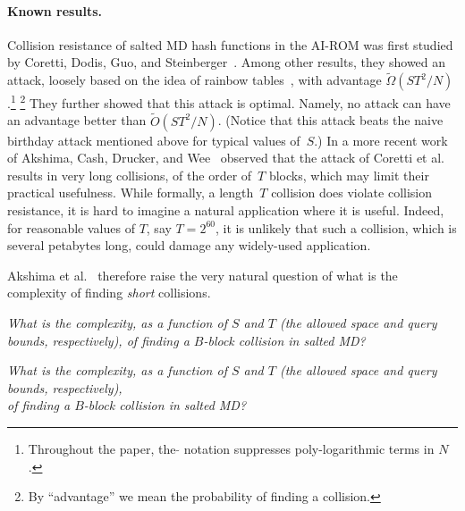 \paragraph{Known results.}
Collision resistance of salted MD hash functions in the AI-ROM was first
studied by Coretti, Dodis, Guo, and Steinberger~\cite{CorettiDGS18}. Among other results, they showed an attack,  loosely based on the idea of rainbow tables~\cite{Hellman80,Oechslin03}, with advantage $\tilde\Omega(ST^2/N)$.\footnote{Throughout the paper, the $\tilde{}$ notation suppresses poly-logarithmic terms in $N$.} \footnote{By ``advantage'' we mean the probability of finding a collision.} They further showed that this attack is optimal. Namely, no attack can have an advantage better than $\tilde O(ST^2/N)$. (Notice that this attack beats the naive birthday attack mentioned above for typical values of~$S$.) In a more recent work of Akshima,  Cash, Drucker, and Wee~\cite{AkshimaCDW20} observed that the attack of Coretti et al.~\cite{CorettiDGS18} results in very long collisions, of the order of~$T$ blocks, which may limit their practical usefulness. While formally, a length~$T$ collision does violate collision resistance, it is hard to imagine a natural application where it is useful. Indeed, for reasonable values of $T$, say $T=2^{60}$, it is unlikely that such a collision, which is several petabytes long, could damage any widely-used application.

Akshima et al.~\cite{AkshimaCDW20} therefore raise the very natural question of what is the complexity of finding \emph{short} collisions. 

\ifnum{}
\begin{center}
{ \it What is the complexity, as a function of $S$ and $T$ (the allowed space and query bounds, respectively), of finding a  $B$-block collision in salted MD?}
\end{center}
\else
\begin{center}
{ \it What is the complexity, as a function of $S$ and $T$ (the allowed space and query bounds, respectively), \\of finding a  $B$-block collision in salted MD?}
\end{center}
\fi




